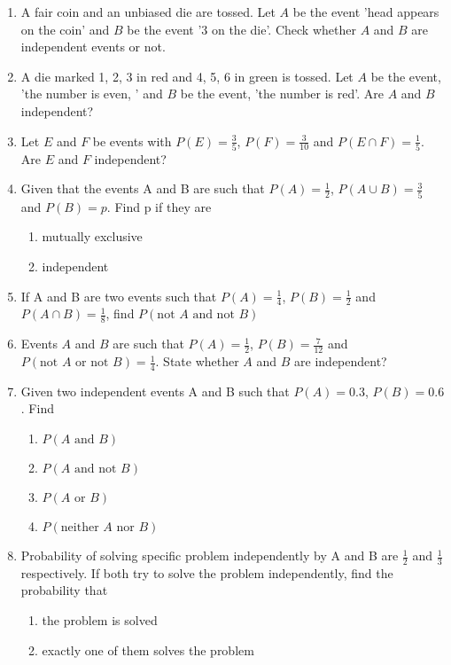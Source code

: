 \begin{enumerate}[label=\thesection.\arabic*,ref=\thesection.\theenumi]
\item  A fair coin and an unbiased die are tossed. Let $A$ be the event 'head appears on the coin' and $B$ be the event '3 on the die'. Check whether $A$ and $B$ are independent events or not.
		\label{ncert/12/13/2/4}
		\item  A die marked 1, 2, 3 in red and 4, 5, 6 in green is tossed. Let $A$ be the event, 'the number is even, ' and $B$ be the event, 'the number is red'. Are $A$ and $B$ independent?
		\label{ncert/12/13/2/5}
		\item Let $E$ and $F$ be events with $P(E)=\frac{3}{5}$, $P(F)=\frac{3}{10}$ and $P(E \cap F)=\frac{1}{5}$. Are $E$ and $F$ independent?
\item Given that the events A and B are such that $P(A)=\frac{1}{2}$, $P(A \cup B)=\frac{3}{5}$ and $P(B)=p$. Find p if they are
		\label{ncert/12/13/2/6}
\begin{enumerate}
\item mutually exclusive
\item independent
\end{enumerate}
\item If A and B are two events such that $P(A)=\frac{1}{4}$, $P(B)=\frac{1}{2}$ and $P(A \cap B)=\frac{1}{8}$, find $P(\text{not }A \text{ and not }B)$
		\label{ncert/12/13/2/8}
\item Events $A$ and $B$ are such that $P(A)=\frac{1}{2}$, $P(B)=\frac{7}{12}$ and $P(\text{not }A \text{ or not }B)=\frac{1}{4}$. State whether $A$ and $B$ are independent?
		\label{ncert/12/13/2/9}
\item Given two independent events A and B such that $P(A) = 0.3$, $P(B) = 0.6$. Find
		\label{ncert/12/13/2/10}
\begin{enumerate}
\item $P(A\text{ and } B)$
\item $P(A \text{ and not } B)$
\item $P(A \text{ or } B)$
\item $P(\text{neither } A \text{ nor } B)$
\end{enumerate}
%
\item Probability of solving specific problem independently by A and B are $\frac{1}{2}$ and $\frac{1}{3}$ respectively. If both try to solve the problem independently, find the probability that
		\label{ncert/12/13/2/13}
\begin{enumerate}
\item the problem is solved
\item exactly one of them solves the problem

\end{enumerate}
\end{enumerate}

